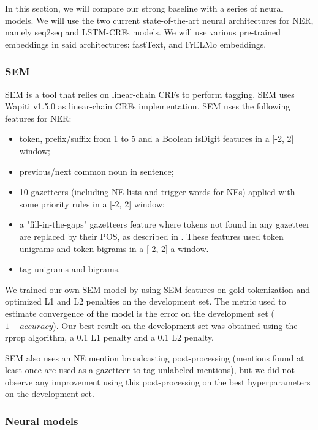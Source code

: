 In this section, we will compare our strong baseline with a series of neural models. We will use the two current state-of-the-art neural architectures for NER, namely seq2seq and LSTM-CRFs models. We will use various pre-trained embeddings in said architectures: fastText, \camembert and FrELMo embeddings.


\subsubsection{SEM}
SEM \citep{dupont-2017-exploration} is a tool that relies on linear-chain CRFs \citep{lafferty-etal-2001-conditional} to perform tagging. SEM uses Wapiti \citep{lavergne-etal-2010-practical} v1.5.0 as linear-chain CRFs implementation. SEM uses the following features for NER:
\begin{itemize}
    \item token, prefix/suffix from 1 to 5 and a Boolean isDigit features in a [-2, 2] window;
    \item previous/next common noun in sentence;
    \item 10 gazetteers (including NE lists and trigger words for NEs) applied with some priority rules in a [-2, 2] window;
    \item a "fill-in-the-gaps" gazetteers feature where tokens not found in any gazetteer are replaced by their POS, as described in \citep{raymond-fayolle-2010-reconnaissance}. These features used token unigrams and token bigrams in a [-2, 2] a window.
    \item tag unigrams and bigrams.
\end{itemize}

We trained our own SEM model by using SEM features on gold tokenization and optimized L1 and L2 penalties on the development set. The metric used to estimate convergence of the model is the error on the development set ($1 - accuracy$). Our best result on the development set was obtained using the rprop algorithm, a 0.1 L1 penalty and a 0.1 L2 penalty.

SEM also uses an NE mention broadcasting post-processing (mentions found at least once are used as a gazetteer to tag unlabeled mentions), but we did not observe any improvement using this post-processing on the best hyperparameters on the development set.


\subsubsection{Neural models}

